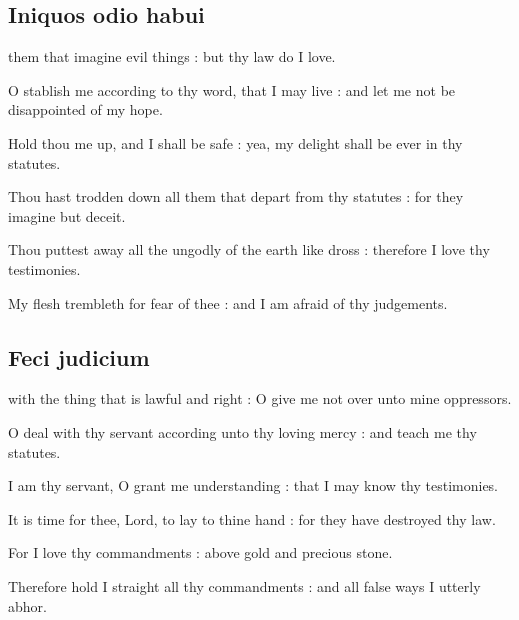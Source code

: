 \subsection{Iniquos odio habui}
 them that imagine evil things : but thy law do I love.\par
{}
O stablish me according to thy word, that I may live : and let me not be disappointed of my hope.\par
{}Hold thou me up, and I shall be safe : yea, my delight shall be ever in thy statutes.\par
{}Thou hast trodden down all them that depart from thy statutes : for they imagine but deceit.\par
{}Thou puttest away all the ungodly of the earth like dross : therefore I love thy testimonies.\par
{}My flesh trembleth for fear of thee : and I am afraid of thy judgements.\par

\subsection{Feci judicium}
 with the thing that is lawful and right : O give me not over unto mine oppressors.\par
{}
O deal with thy servant according unto thy loving mercy : and teach me thy statutes.\par
{}I am thy servant, O grant me understanding : that I may know thy testimonies.\par
{}It is time for thee, Lord, to lay to thine hand : for they have destroyed thy law.\par
{}For I love thy commandments : above gold and precious stone.\par
{}Therefore hold I straight all thy commandments : and all false ways I utterly abhor.\par

